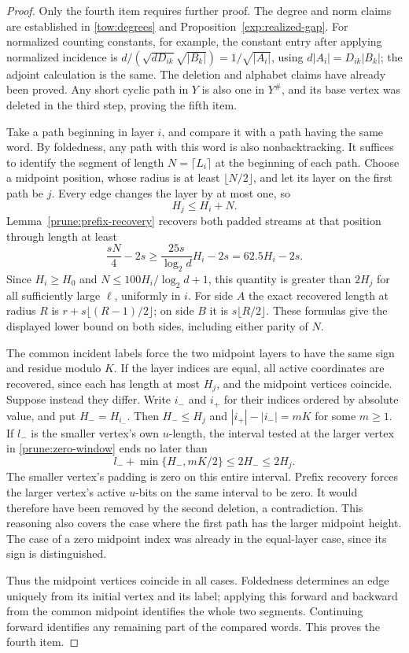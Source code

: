 \begin{proof}
Only the fourth item requires further proof.  The degree and norm
claims are established in \eqref{tow:degrees} and
Proposition~\ref{exp:realized-gap}.  For normalized counting
constants, for example, the constant entry after applying normalized
incidence is
\(d/(\sqrt{dD_{ik}}\sqrt{|B_k|})=1/\sqrt{|A_i|}\),
using \(d|A_i|=D_{ik}|B_k|\); the adjoint calculation is the same.
The deletion and alphabet claims have already been proved.
Any short cyclic path in \(Y\) is also one in \(Y^\#\), and its
base vertex was deleted in the third step, proving the fifth item.

Take a path beginning in layer \(i\), and compare it with a path
having the same word.  By foldedness, any path with this word is also
nonbacktracking.  It suffices to identify the segment of length
\(N=\lceil L_i\rceil\) at the beginning of each path.  Choose a
midpoint position, whose radius is at least \(\lfloor N/2\rfloor\),
and let its layer on the first path be \(j\).  Every edge changes
the layer by at most one, so
\[
 H_j\leq H_i+N.
\]
Lemma~\ref{prune:prefix-recovery} recovers both padded streams at
that position through length at least
\[
 \frac{sN}{4}-2s
 \geq\frac{25s}{\log_2d}H_i-2s
 =62.5H_i-2s.
\]
Since \(H_i\geq H_0\) and
\(N\leq100H_i/\log_2d+1\), this quantity is greater than
\(2H_j\) for all sufficiently large \(\ell\), uniformly in \(i\).
For side \(A\) the exact recovered length at radius \(R\) is
\(r+s\lfloor(R-1)/2\rfloor\); on side \(B\) it is
\(s\lfloor R/2\rfloor\).  These formulas give the displayed
lower bound on both sides, including either parity of \(N\).

The common incident labels force the two midpoint layers to have the
same sign and residue modulo \(K\).  If the layer indices are equal,
all active coordinates are recovered, since each has length at most
\(H_j\), and the midpoint vertices coincide.
Suppose instead they differ.  Write \(i_-\) and \(i_+\) for their
indices ordered by absolute value, and put \(H_-=H_{i_-}\).
Then \(H_-\leq H_j\) and \(|i_+|-|i_-|=mK\) for some
\(m\geq1\).  If \(l_-\) is the smaller vertex's own
\(u\)-length, the interval tested at the larger vertex in
\eqref{prune:zero-window} ends no later than
\[
 l_-+\min\{H_-,mK/2\}\leq 2H_-\leq2H_j.
\]
The smaller vertex's padding is zero on this entire interval.
Prefix recovery forces the larger vertex's active \(u\)-bits on
the same interval to be zero.  It would therefore have been removed
by the second deletion, a contradiction.  This reasoning also covers
the case where the first path has the larger midpoint height.  The
case of a zero midpoint index was already in the equal-layer case,
since its sign is distinguished.

Thus the midpoint vertices coincide in all cases.  Foldedness
determines an edge uniquely from its initial vertex and its label;
applying this forward and backward from the common midpoint identifies
the whole two segments.  Continuing forward identifies any remaining
part of the compared words.  This proves the fourth item.
\end{proof}

